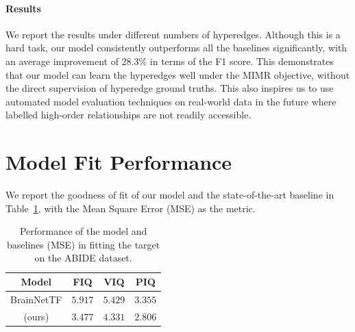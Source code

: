 \paragraph{Results}
We report the results under different numbers of hyperedges. Although this is a hard task, our model consistently outperforms all the baselines significantly, with an average improvement of 28.3\% in terms of the F1 score. This demonstrates that our model can learn the hyperedges well under the MIMR objective, without the direct supervision of hyperedge ground truths. This also inspires us to use automated model evaluation techniques \cite{wang2023toward, peng2023came, peng2024energy} on real-world data in the future where labelled high-order relationships are not readily accessible. 


\section{Model Fit Performance}
We report the goodness of fit of our model and the state-of-the-art baseline in Table~\ref{tab:fit_abide}, with the Mean Square Error (MSE) as the metric.
\label{app:fit}
\begin{table}[H]
    \centering
    \begin{tabular}{c|ccc}
    \toprule
        Model & FIQ & VIQ & PIQ \\
    \midrule
        BrainNetTF & $5.917$  &	$5.429$ & $3.355$ \\
\hybrid{} (ours) & $\mathbf{3.477}$ &	$\mathbf{4.331}$ &	$\mathbf{2.806}$ \\
\bottomrule
    \end{tabular}
    \caption{Performance of the model and baselines (MSE) in fitting the target on the ABIDE dataset. }
    \label{tab:fit_abide}
\end{table}

